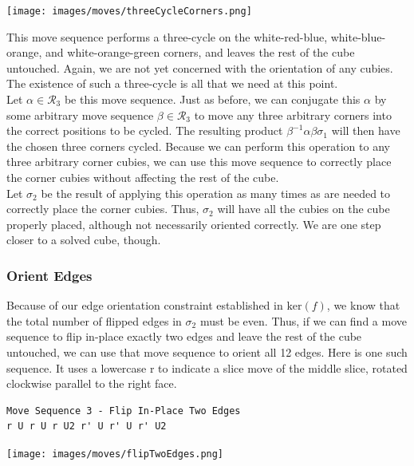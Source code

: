 \documentclass[10pt,letterpaper]{report}
\begin{document}
\begin{center}
\texttt{[image: images/moves/threeCycleCorners.png]} 
\end{center}

This move sequence performs a three-cycle on the white-red-blue, white-blue-orange, and white-orange-green corners, and leaves the rest of the cube untouched.  Again, we are not yet concerned with the orientation of any cubies.  The existence of such a three-cycle is all that we need at this point. \\

Let $\alpha \in \mathcal{R}_3$ be this move sequence.  Just as before, we can conjugate this $\alpha$ by some arbitrary move sequence $\beta \in \mathcal{R}_3$ to move any three arbitrary corners into the correct positions to be cycled.  The resulting product $\beta^{-1}\alpha\beta\sigma_1$ will then have the chosen three corners cycled.  Because we can perform this operation to any three arbitrary corner cubies, we can use this move sequence to correctly place the corner cubies without affecting the rest of the cube. \\

Let $\sigma_2$ be the result of applying this operation as many times as are needed to correctly place the corner cubies.  Thus, $\sigma_2$ will have all the cubies on the cube properly placed, although not necessarily oriented correctly.  We are one step closer to a solved cube, though.

\subsubsection{Orient Edges}

Because of our edge orientation constraint established in $\text{ker}(f)$, we know that the total number of flipped edges in $\sigma_2$ must be even.  Thus, if we can find a move sequence to flip in-place exactly two edges and leave the rest of the cube untouched, we can use that move sequence to orient all 12 edges.  Here is one such sequence.  It uses a lowercase r to indicate a slice move of the middle slice, rotated clockwise parallel to the right face.

\begin{verbatim}
Move Sequence 3 - Flip In-Place Two Edges
r U r U r U2 r' U r' U r' U2
\end{verbatim}

\begin{center}
\texttt{[image: images/moves/flipTwoEdges.png]} 
\end{center}
\end{document}
